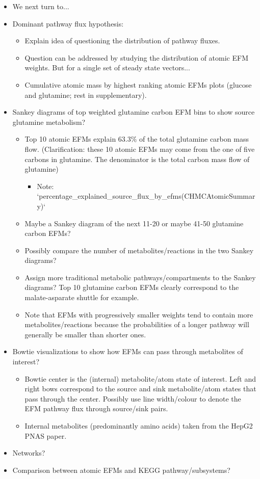 \documentclass[11pt]{article}
\begin{document}
\begin{itemize}
    \item We next turn to...
    \item Dominant pathway flux hypothesis:
    \begin{itemize}
        \item Explain idea of questioning the distribution of pathway fluxes.
        \item Question can be addressed by studying the distribution of atomic EFM weights. But for a single set of steady state vectors...
        \item Cumulative atomic mass by highest ranking atomic EFMs plots (glucose and glutamine; rest in supplementary).
    \end{itemize}
    \item Sankey diagrams of top weighted glutamine carbon EFM bins to show source glutamine metabolism?
    \begin{itemize}
        \item Top 10 atomic EFMs explain 63.3\% of the total glutamine carbon mass flow. (Clarification: these 10 atomic EFMs may come from the one of five carbons in glutamine. The denominator is the total carbon mass flow of glutamine)
        \begin{itemize}
            \item Note: `percentage_explained_source_flux_by_efms(CHMCAtomicSummary)`
        \end{itemize}
        \item Maybe a Sankey diagram of the next 11-20 or maybe 41-50 glutamine carbon EFMs?
        \item Possibly compare the number of metabolites/reactions in the two Sankey diagrams?
        \item Assign more traditional metabolic pathways/compartments to the Sankey diagrams? Top 10 glutamine carbon EFMs clearly correspond to the malate-asparate shuttle for example.
        \item Note that EFMs with progressively smaller weights tend to contain more metabolites/reactions because the probabilities of a longer pathway will generally be smaller than shorter ones.
    \end{itemize}
    \item Bowtie visualizations to show how EFMs can pass through metabolites of interest?
    \begin{itemize}
        \item Bowtie center is the (internal) metabolite/atom state of interest. Left and right bows correspond to the source and sink metabolite/atom states that pass through the center. Possibly use line width/colour to denote the EFM pathway flux through source/sink pairs.
        \item Internal metabolites (predominantly amino acids) taken from the HepG2 PNAS paper.
    \end{itemize}
    \item Networks?
    \item Comparison between atomic EFMs and KEGG pathway/subsystems?
\end{itemize}
\end{document}
